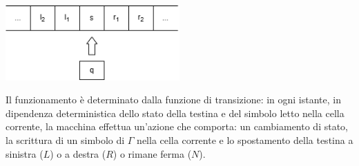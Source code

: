 \documentclass[12pt, a4paper]{report}
\begin{document}
            \begin{center}
                \includegraphics[width=0.5\textwidth]{Images/turingmachine.png}
            \end{center}
            Il funzionamento è determinato dalla funzione di transizione: in ogni istante, in dipendenza deterministica dello stato della testina e del simbolo letto nella cella corrente, la macchina effettua un'azione che comporta: un cambiamento di stato, la scrittura di un simbolo di $\Gamma$ nella cella corrente e lo spostamento della testina a sinistra ($L$) o a destra ($R$) o rimane ferma ($N$).
\end{document}
